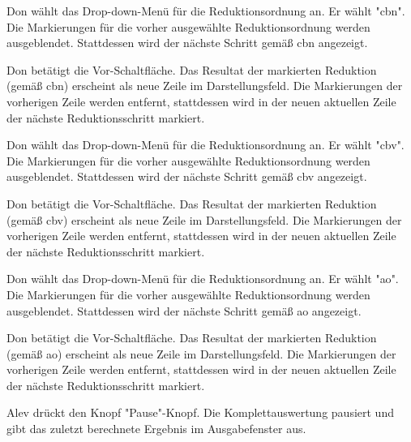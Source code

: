 \documentclass[parskip=full,11pt,twoside]{scrartcl}
\begin{document}
{Don wählt das Drop-down-Menü für die Reduktionsordnung an. Er wählt "\gls{cbn}".}
{Die Markierungen für die vorher ausgewählte Reduktionsordnung werden ausgeblendet.
Stattdessen wird der nächste Schritt gemäß \gls{cbn} angezeigt.}

{Don betätigt die Vor-Schaltfläche.}
{Das Resultat der markierten Reduktion (gemäß \gls{cbn}) erscheint als neue Zeile im Darstellungsfeld.
Die Markierungen der vorherigen Zeile werden entfernt, stattdessen wird in der neuen
aktuellen Zeile der nächste Reduktionsschritt markiert.}

{Don wählt das Drop-down-Menü für die Reduktionsordnung an. Er wählt "\gls{cbv}".}
{Die Markierungen für die vorher ausgewählte Reduktionsordnung werden ausgeblendet.
Stattdessen wird der nächste Schritt gemäß \gls{cbv} angezeigt.}

{Don betätigt die Vor-Schaltfläche.}
{Das Resultat der markierten Reduktion (gemäß \gls{cbv}) erscheint als neue Zeile im Darstellungsfeld.
Die Markierungen der vorherigen Zeile werden entfernt, stattdessen wird in der neuen
aktuellen Zeile der nächste Reduktionsschritt markiert.}

{Don wählt das Drop-down-Menü für die Reduktionsordnung an. Er wählt "\gls{ao}".}
{Die Markierungen für die vorher ausgewählte Reduktionsordnung werden ausgeblendet.
Stattdessen wird der nächste Schritt gemäß \gls{ao} angezeigt.}

{Don betätigt die Vor-Schaltfläche.}
{Das Resultat der markierten Reduktion (gemäß \gls{ao}) erscheint als neue Zeile im Darstellungsfeld.
Die Markierungen der vorherigen Zeile werden entfernt, stattdessen wird in der neuen
aktuellen Zeile der nächste Reduktionsschritt markiert.}


{Alev drückt den Knopf "Pause"-Knopf.}
{Die Komplettauswertung pausiert und gibt das zuletzt berechnete Ergebnis im Ausgabefenster aus.}
\end{document}
